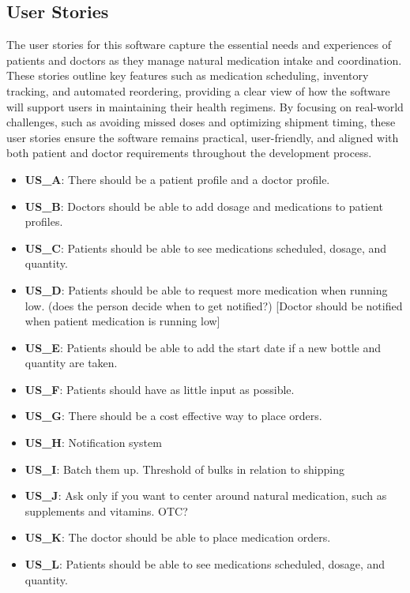 \documentclass{article}
\begin{document}
\subsection{User Stories}
The user stories for this software capture the essential needs and experiences of patients and doctors as they manage natural medication intake and coordination. These stories outline key features such as medication scheduling, inventory tracking, and automated reordering, providing a clear view of how the software will support users in maintaining their health regimens. By focusing on real-world challenges, such as avoiding missed doses and optimizing shipment timing, these user stories ensure the software remains practical, user-friendly, and aligned with both patient and doctor requirements throughout the development process.
\begin{itemize}
    \item \textbf{US\_A}: There should be a patient profile and a doctor profile.
    \item \textbf{US\_B}: Doctors should be able to add dosage and medications to patient profiles.
    \item \textbf{US\_C}: Patients should be able to see medications scheduled, dosage, and quantity. 
    \item \textbf{US\_D}: Patients should be able to request more medication when running low. (does the person decide when to get notified?) [Doctor should be notified when patient medication is running low]
    \item \textbf{US\_E}: Patients should be able to add the start date if a new bottle and quantity are taken.
    \item \textbf{US\_F}: Patients should have as little input as possible. 
    \item \textbf{US\_G}: There should be a cost effective way to place orders.
    \item  \textbf{US\_H}: Notification system
    \item \textbf{US\_I}: Batch them up. Threshold of bulks in relation to shipping 
    \item \textbf{US\_J}: Ask only if you want to center around natural medication, such as supplements and vitamins. OTC?
    \item \textbf{US\_K}: The doctor should be able to place medication orders.
    \item \textbf{US\_L}: Patients should be able to see medications scheduled, dosage, and quantity. 
\end{itemize}
\end{document}

